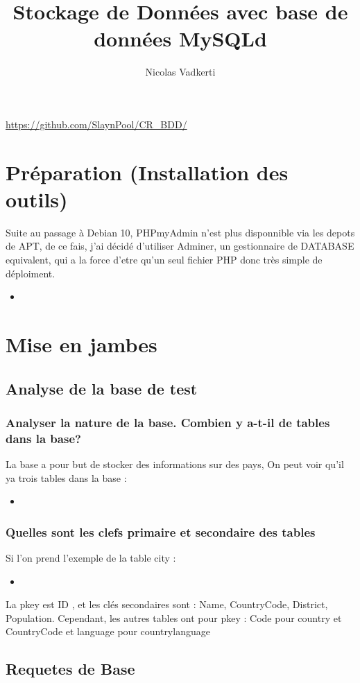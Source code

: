 \documentclass[a4paper,10pt]{article}
\title{Stockage de Données avec base de données MySQLd}
\author{Nicolas Vadkerti}
\newcommand{\insertcode}[2]{\begin{itemize}\item[]\end{itemize}}
\begin{document}
\maketitle


\url{https://github.com/SlaynPool/CR_BDD/}

\section{Préparation (Installation des outils)}

 Suite  au passage à Debian 10, PHPmyAdmin n'est plus disponnible via les depots de APT, de ce fais, j'ai décidé d'utiliser Adminer, un gestionnaire de DATABASE equivalent, qui a la force d'etre qu'un seul fichier PHP donc très simple de déploiment.
 
 \insertcode{commande/1.txt}{Installation de Adminer }
\newpage
 \section{Mise en jambes}
 \subsection{Analyse de la base de test}
 \subsubsection{Analyser la nature de la base. Combien y a-t-il de tables dans la base?}
 La base a pour but de stocker des informations sur des pays, On peut voir qu'il ya trois tables dans la base :
 \insertcode{commande/2.txt}{SHOW TABLES}
 
  \subsubsection{Quelles sont les clefs primaire et secondaire des tables}
 Si l'on prend l'exemple de la table city :
 \insertcode{commande/3.txt}{SELECT * FROM city;}
 La pkey est  ID , et les clés secondaires sont : Name, CountryCode, District, Population.
 Cependant, les autres tables ont pour pkey : Code pour country et  CountryCode et language pour countrylanguage
 
 
 \subsection{Requetes de Base}
\end{document}
